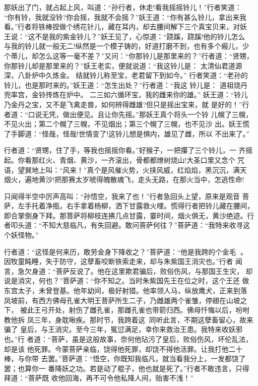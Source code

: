 那妖出了门，就占起上风，叫道：“孙行者，休走!看我摇摇铃儿！”行者笑道：
“你有铃，我就没铃?你会摇，我就不会摇？”妖王道：“你有甚么铃儿，拿出来我
看。”行者将铁棒捏做个绣花针儿，藏在耳内，却去腰间解下三个真宝贝来，对妖
王说：“这不是我的紫金铃儿？”妖王见了，心惊道：“跷蹊，跷蹊!他的铃儿怎么
与我的铃儿就一般无二!纵然是一个模子铸的，好道打磨不到，也有多个瘢儿，少
个蒂儿，却怎么这等一毫不差？”又问：“你那铃儿是那里来的？”行者道：“贤甥，
你那铃儿却是那里来的？”妖王老实，便就说道：“我这铃儿是：
太清仙君道源深，八卦炉中久炼金。
结就铃儿称至宝，老君留下到如今。”
行者笑道：“老孙的铃儿，也是那时来的。”妖王道：“怎生出处？”行者道：“我这
铃儿是：
道祖烧丹兜率宫，金铃抟炼在炉中。
二三如六循环宝，我的雌来你的雄。”
妖王道：“铃儿乃金丹之宝，又不是飞禽走兽，如何辨得雌雄?但只是摇出宝来，就
是好的！”行者道：“口说无凭，做出便见。且让你先摇。”那妖王真个将头一个铃
儿幌了三幌，不见火出；第二个幌了三幌，不见烟出；第三个幌了三幌，也不见沙
出。妖王慌了手脚道：“怪哉，怪哉!世情变了!这铃儿想是惧内，雄见了雌，所以
不出来了。”

行者道：“贤甥，住了手，等我也摇摇你看。”好猴子，一把攥了三个铃儿，一
齐摇起。你看那红火、青烟、黄沙，一齐滚出，骨都都燎树烧山!大圣口里又念个
咒语，望巽地上叫：“风来！”真个是风催火势，火挟风威，红焰焰，黑沉沉，满天
烟火，遍地黄沙!把那赛太岁唬得魄散魂飞，走头无路，在那火当中，怎逃性命!

只闻得半空中厉声高叫：“孙悟空，我来了也！”行者急回头上望，原来是观音
菩萨，左手托着净瓶，右手拿着杨柳，洒下甘露救火哩。慌得行者把铃儿藏在腰间，
即合掌倒身下拜。那菩萨将柳枝连拂几点甘露，霎时间，烟火俱无，黄沙绝迹。行
者叩头道：“不知大慈临凡，有失回避。敢问菩萨何往？”菩萨道：“我特来收寻这
个妖怪物。”

行者道：“这怪是何来历，敢劳金身下降收之？”菩萨道：“他是我跨的个金毛
。因牧童盹睡，失于防守，这孽畜咬断铁索走来，却与朱紫国王消灾也。”行者
闻言，急欠身道：“菩萨反说了。他在这里欺君骗后，败俗伤风，与那国王生灾，
却说是消灾，何也？”菩萨道：“你不知之。当时朱紫国先王在位之时，这个王还
做东宫太子，未曾登基。他年幼间，极好射猎。他率领人马，纵放鹰犬，正来到落
凤坡前，有西方佛母孔雀大明王菩萨所生二子，乃雌雄两个雀雏，停翅在山坡之下，
被此王弓开处，射伤了雌孔雀，那雌孔雀也带箭归西。佛母忏悔以后，吩咐教他拆
凤三年，身耽啾疾。那时节，我跨着这，同听此言，不期这孽畜留心，故来骗了
皇后，与王消灾。至今三年，冤愆满足，幸你来救治王患。我特来收妖邪也。”行
者道：“菩萨，虽是这般故事，奈何他玷污了皇后，败俗伤风，坏伦乱法，却是该
他死罪。今蒙菩萨亲临，饶得他死罪，却饶不得他活罪。让我打他二十棒，与你带
去罢。”菩萨道：“悟空，你既知我临凡，就当看我分上，一发都饶了罢；也算你一
番降妖之功。若是动了棍子，他也就是死了。”行者不敢违言，只得拜道：“菩萨既
收他回海，再不可令他私降人间，贻害不浅！”

